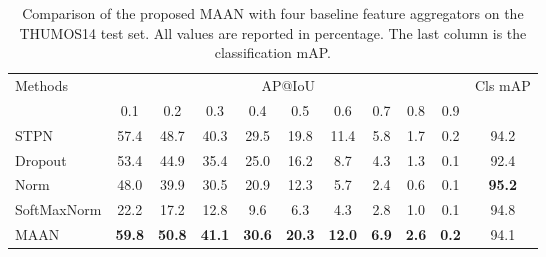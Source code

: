 \documentclass{article} \usepackage{iclr2019_conference,times}
\begin{document}
\begin{table}[t]
\vspace{-4mm}
\label{tab:model_compare}
\centering
\begin{footnotesize}
\vspace{-3mm}
\caption{Comparison of the proposed MAAN with four baseline feature aggregators on the THUMOS14 test set. All values are reported in percentage. The last column is the classification mAP.}
\label{tab:model_compare}
\begin{tabular}{lcccccccccc}
\toprule
 \multirow{2}{*}{Methods} & \multicolumn{9}{c}{AP@IoU}   &    \multirow{2}{*}{Cls mAP} \\ 
                                                           & 0.1 & 0.2 & 0.3 & 0.4 & 0.5 & 0.6 & 0.7 & 0.8 & 0.9 & \\ \midrule

STPN & 57.4  &  48.7 & 40.3  &  29.5 &  19.8 &  11.4  & 5.8  &  1.7   &  0.2 & 94.2 \\ 
Dropout & 53.4 &  44.9 & 35.4  & 25.0 &  16.2 &  8.7   & 4.3  & 1.3   & 0.1  & 92.4 \\ 
Norm & 48.0 & 39.9 & 30.5 & 20.9 & 12.3  & 5.7 &  2.4  &  0.6  &  0.1 & \textbf{95.2} \\  
SoftMaxNorm & 22.2 & 17.2 & 12.8 & 9.6 & 6.3  &  4.3  &  2.8 &  1.0  &  0.1 & 94.8 \\  
 MAAN & \textbf{59.8} & \textbf{50.8} & \textbf{41.1} & \textbf{30.6} & \textbf{20.3}  & \textbf{12.0}    & \textbf{6.9} & \textbf{2.6} & \textbf{0.2}  & 94.1 \\ \bottomrule
\end{tabular}
\end{footnotesize}
\end{table}
\end{document}
